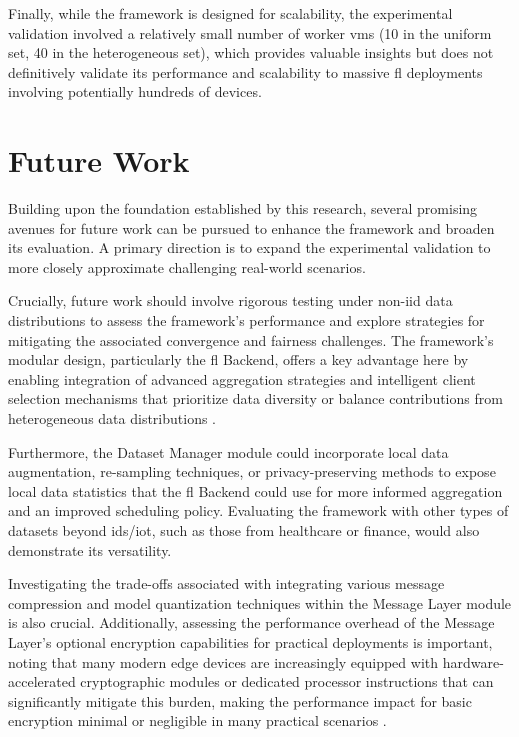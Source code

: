 Finally, while the framework is designed for scalability, the experimental validation involved a relatively small number of worker \acp{vm} (10 in the uniform set, 40 in the heterogeneous set), which provides valuable insights but does not definitively validate its performance and scalability to massive \ac{fl} deployments involving potentially hundreds of devices.



\section{Future Work}
\label{sec:future-work}


Building upon the foundation established by this research, several promising avenues for future work can be pursued to enhance the framework and broaden its evaluation. A primary direction is to expand the experimental validation to more closely approximate challenging real-world scenarios. 

Crucially, future work should involve rigorous testing under \ac{non-iid} data distributions to assess the framework's performance and explore strategies for mitigating the associated convergence and fairness challenges. The framework's modular design, particularly the \ac{fl} Backend, offers a key advantage here by enabling integration of advanced aggregation strategies and intelligent client selection mechanisms that prioritize data diversity or balance contributions from heterogeneous data distributions \cite{zhao2018federated}. 

Furthermore, the Dataset Manager module could incorporate local data augmentation, re-sampling techniques, or privacy-preserving methods to expose local data statistics that the \ac{fl} Backend could use for more informed aggregation and an improved scheduling policy. Evaluating the framework with other types of datasets beyond \ac{ids}/\ac{iot}, such as those from healthcare or finance, would also demonstrate its versatility.

Investigating the trade-offs associated with integrating various message compression and model quantization techniques within the Message Layer module is also crucial. Additionally, assessing the performance overhead of the Message Layer's optional encryption capabilities for practical deployments is important, noting that many modern edge devices are increasingly equipped with hardware-accelerated cryptographic modules or dedicated processor instructions that can significantly mitigate this burden, making the performance impact for basic encryption minimal or negligible in many practical scenarios \cite{dhanda2020lightweight, Silva2023}. 

